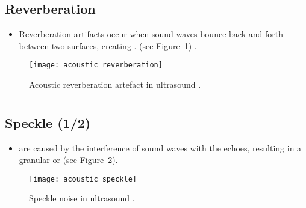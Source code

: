 \subsection{Reverberation}
\begin{itemize}
\item Reverberation artifacts occur when sound waves bounce back and
  forth between two surfaces, creating . (see
  Figure~\ref{fig:acoustic_reverberation}) \cite{NysoraArtifacts}.
\end{itemize}
\vspace{-4ex}
\begin{figure}[!h]
  \centering
  \texttt{[image: acoustic\_reverberation]}
  \caption{Acoustic reverberation artefact in ultrasound
    \cite{NysoraArtifacts}.\label{fig:acoustic_reverberation}}
\end{figure}

\section*{}
\subsection{Speckle (1/2)}
\begin{itemize}
\item {} are
  caused by the interference of sound waves with the echoes, resulting
  in a granular or   \cite{NysoraArtifacts} (see
  Figure~\ref{fig:acoustic_speckle}).
\end{itemize}
\vspace{-3ex}
\begin{figure}[!h]
  \centering
  \texttt{[image: acoustic\_speckle]}
  \caption{Speckle noise in ultrasound
    \cite{LIASIS2008427}.\label{fig:acoustic_speckle}}
\end{figure}

\section*{}
